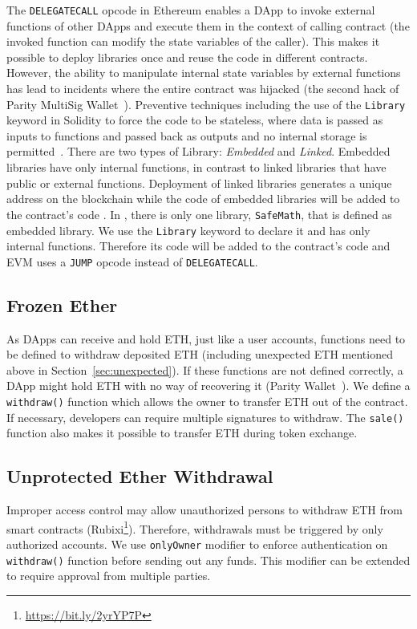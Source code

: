 The \texttt{DELEGATECALL} opcode in Ethereum enables a DApp to invoke external functions of other DApps and execute them in the context of calling contract (\ie the invoked function can modify the state variables of the caller). This makes it possible to deploy libraries once and reuse the code in different contracts. However, the ability to manipulate internal state variables by external functions has lead to incidents where the entire contract was hijacked (\cf the second hack of Parity MultiSig Wallet~\cite{ParitySecondHack}). Preventive techniques including the use of the \texttt{Library} keyword in Solidity to force the code to be stateless, where data is passed as inputs to functions and passed back as outputs and no internal storage is permitted~\cite{LIB1}. There are two types of Library: \textit{Embedded} and \textit{Linked}. Embedded libraries have only internal functions, in contrast to linked libraries that have public or external functions. Deployment of linked libraries generates a unique address on the blockchain while the code of embedded libraries will be added to the contract's code \cite{LIB2}. In \sys, there is only one library, \texttt{SafeMath}, that is defined as embedded library. We use the \texttt{Library} keyword to declare it and has only internal functions. Therefore its code will be added to the \erc contract's code and EVM uses a \texttt{JUMP} opcode instead of \texttt{DELEGATECALL}.

\subsection{Frozen Ether}

As DApps can receive and hold ETH, just like a user accounts, functions need to be defined to withdraw deposited ETH (including unexpected ETH mentioned above in Section~\ref{sec:unexpected}). If these functions are not defined correctly, a DApp might hold ETH with no way of recovering it (\cf Parity Wallet~\cite{ParityWalletHack}). We define a \texttt{withdraw()} function which allows the owner to transfer ETH out of the contract. If necessary, developers can require multiple signatures to withdraw. The \texttt{sale()} function also makes it possible to transfer ETH during token exchange.

\subsection{Unprotected Ether Withdrawal}

Improper access control may allow unauthorized persons to withdraw ETH from smart contracts (\cf Rubixi\footnote{\url{https://bit.ly/2yrYP7P}}). Therefore, withdrawals must be triggered by only authorized accounts. We use \texttt{onlyOwner} modifier to enforce authentication on \texttt{withdraw()} function before sending out any funds. This modifier can be extended to require approval from multiple parties.

